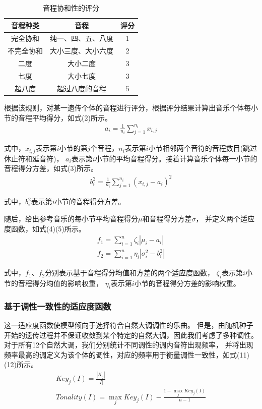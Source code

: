 \documentclass{article}
\begin{document}
\begin{table}[htbp]
    \centering
    \caption{音程协和性的评分}
      \begin{tabular}{ccc}
      \toprule
      音程种类 & 音程 & 评分 \\
      \midrule
      完全协和 & 纯一、四、五、八度 & 1 \\
      不完全协和 & 大小三度、大小六度 & 2 \\
      二度 & 大小二度 & 3 \\
      七度 & 大小七度 & 3 \\
      超八度 & 超过八度的音程 & 5 \\
      \bottomrule
      \end{tabular}
  \end{table}%

根据该规则，对某一遗传个体的音程进行评分，根据评分结果计算出音乐个体每小节的音程平均得分，如式(2)所示。
\begin{align}
    a_i = \frac{1}{n_i}\sum_{j=1}^{n_i} x_{i,j}
\end{align}

式中，$x_{i,j}$表示第$i$小节的第$j$个音程，$n_i$表示第$i$小节相邻两个音符的音程数目(跳过休止符和延音符)，
$a_i$表示第$i$小节的平均音程得分。接着计算音乐个体每一小节的音程得分方差，如式(3)所示。
\begin{align}
    b_i ^2 = \frac{1}{n_i}\sum_{j=1}^{n_i} (x_{i,j}-a_i)^2
\end{align}

式中，$b_i ^2$表示第$i$小节的音程得分方差。

随后，给出参考音乐的每小节平均音程得分$\mu$和音程得分方差$\sigma$，
并定义两个适应度函数，如式(4)(5)所示。
\begin{align}
    f_1=\sum_{i=1}^{n}\zeta_i | \mu_i-a_i |\\
    f_2=\sum_{i=1}^{n}\eta_i | \sigma_i ^2-b_i ^2 |
\end{align}

式中，$f_1$、$f_2$分别表示基于音程得分均值和方差的两个适应度函数，
$\zeta_i$表示第$i$小节的音程得分均值的影响权重，
$\eta_i$表示第$i$小节的音程得分方差的影响权重。

\subsubsection{基于调性一致性的适应度函数}

这一适应度函数使模型倾向于选择符合自然大调调性的乐曲。
但是，由随机种子开始的遗传过程并不保证收敛到某个特定的自然大调，因此我们考虑了多种调性。
对于所有12个自然大调，我们分别统计不同调性的调内音符出现频率，
并将出现频率最高的调定义为该个体的调性，对应的频率用于衡量调性一致性，如式(11)(12)所示。
\begin{gather}
    Key_j(I) = \frac{|K_j|}{|I|}\\
    Tonality(I) = \max_j Key_j(I)-\frac{1-\max_j Key_j(I)}{n-1}
\end{gather}
\end{document}
